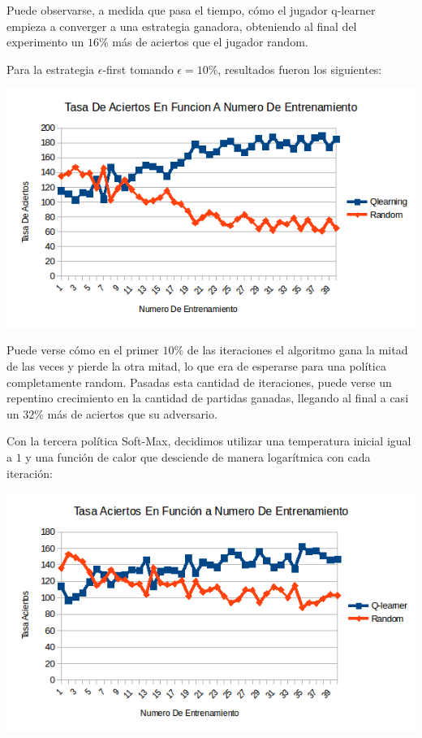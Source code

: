 Puede observarse, a medida que pasa el tiempo, cómo el jugador q-learner empieza a converger a una estrategia ganadora, obteniendo al final del experimento un $16\%$ más de aciertos que el jugador random.

Para la estrategia $\epsilon$-first tomando $\epsilon=10\%$, resultados fueron los siguientes:

\includegraphics[scale=0.5]{testing/ef.png}

Puede verse cómo en el primer $10\%$ de las iteraciones el algoritmo gana la mitad de las veces y pierde la otra mitad, lo que era de esperarse para una política completamente random. Pasadas esta cantidad de iteraciones, puede verse un repentino crecimiento en la cantidad de partidas ganadas, llegando al final a casi un $32\%$ más de aciertos que su adversario.

Con la tercera política Soft-Max, decidimos utilizar una temperatura inicial igual a $1$ y una función de calor que desciende de manera logarítmica con cada iteración:

\includegraphics[scale=0.5]{testing/softmax.png}

